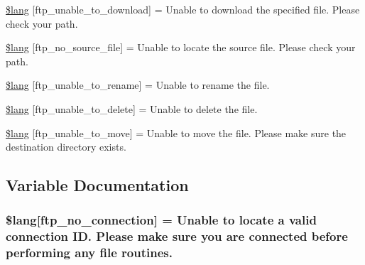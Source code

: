 \begin{DoxyCompactItemize}
\item 
\hyperlink{system_2language_2english_2ftp__lang_8php_a65fa9f8b6a3da91390b36721c2a9775b}{\$lang} \mbox{[}\textquotesingle{}ftp\+\_\+unable\+\_\+to\+\_\+download\textquotesingle{}\mbox{]} = \textquotesingle{}Unable to download the specified file. Please check your path.\textquotesingle{}
\item 
\hyperlink{system_2language_2english_2ftp__lang_8php_abf3e74ee1af13c9b0f0cc63fbb9081f1}{\$lang} \mbox{[}\textquotesingle{}ftp\+\_\+no\+\_\+source\+\_\+file\textquotesingle{}\mbox{]} = \textquotesingle{}Unable to locate the source file. Please check your path.\textquotesingle{}
\item 
\hyperlink{system_2language_2english_2ftp__lang_8php_ae2715b036a8015f4da2841c15ab8db79}{\$lang} \mbox{[}\textquotesingle{}ftp\+\_\+unable\+\_\+to\+\_\+rename\textquotesingle{}\mbox{]} = \textquotesingle{}Unable to rename the file.\textquotesingle{}
\item 
\hyperlink{system_2language_2english_2ftp__lang_8php_a922b1d7a3667e2cacb0873788e548dca}{\$lang} \mbox{[}\textquotesingle{}ftp\+\_\+unable\+\_\+to\+\_\+delete\textquotesingle{}\mbox{]} = \textquotesingle{}Unable to delete the file.\textquotesingle{}
\item 
\hyperlink{system_2language_2english_2ftp__lang_8php_a72178091982e6697b12337601213fa76}{\$lang} \mbox{[}\textquotesingle{}ftp\+\_\+unable\+\_\+to\+\_\+move\textquotesingle{}\mbox{]} = \textquotesingle{}Unable to move the file. Please make sure the destination directory exists.\textquotesingle{}
\end{DoxyCompactItemize}


\subsection{Variable Documentation}
\hypertarget{system_2language_2english_2ftp__lang_8php_a8630404f8e0c3750f8d997f35622b6eb}{}
\subsubsection[{\$lang}]{\setlength{\rightskip}{0pt plus 5cm}\$lang\mbox{[}\textquotesingle{}ftp\+\_\+no\+\_\+connection\textquotesingle{}\mbox{]} = \textquotesingle{}Unable to locate {\bf a} valid connection I\+D. Please make sure you are connected before performing any file routines.\textquotesingle{}}\label{system_2language_2english_2ftp__lang_8php_a8630404f8e0c3750f8d997f35622b6eb}
\hypertarget{system_2language_2english_2ftp__lang_8php_a57d51cf019dd2e380b84c6e31cda0cf5}{}
